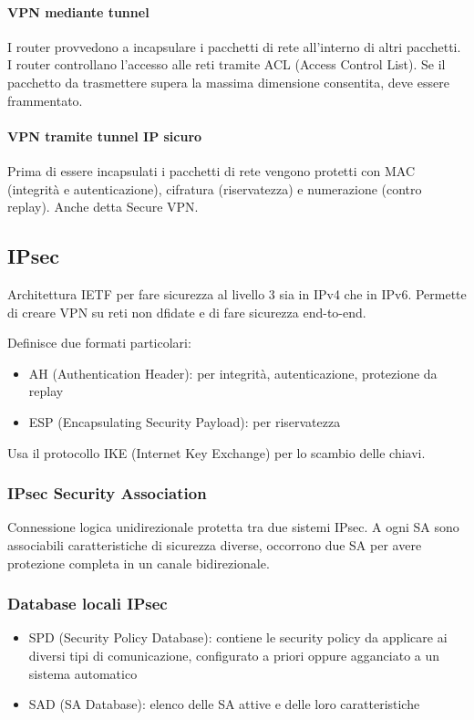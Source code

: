\documentclass[11pt]{article}
\begin{document}
\paragraph*{VPN mediante tunnel}
I router provvedono a incapsulare i pacchetti di rete all'interno di altri pacchetti. I router controllano l'accesso alle 
reti tramite ACL (Access Control List).
Se il pacchetto da trasmettere supera la massima dimensione consentita, deve essere frammentato.
\paragraph*{VPN tramite tunnel IP sicuro}
Prima di essere incapsulati i pacchetti di rete vengono protetti con MAC (integrità e autenticazione), cifratura (riservatezza)
e numerazione (contro replay). Anche detta Secure VPN.
\subsection{IPsec}
Architettura IETF per fare sicurezza al livello 3 sia in IPv4 che in IPv6. Permette di creare VPN su reti non dfidate e 
di fare sicurezza end-to-end.

Definisce due formati particolari:
\begin{itemize}
    \item AH (Authentication Header): per integrità, autenticazione, protezione da replay
    \item ESP (Encapsulating Security Payload): per riservatezza 
\end{itemize}
Usa il protocollo IKE (Internet Key Exchange) per lo scambio delle chiavi.
\subsubsection{IPsec Security Association}
Connessione logica unidirezionale protetta tra due sistemi IPsec. A ogni SA sono associabili caratteristiche di sicurezza 
diverse, occorrono due SA per avere protezione completa in un canale bidirezionale.
\subsubsection{Database locali IPsec}
\begin{itemize}
    \item SPD (Security Policy Database): contiene le security policy da applicare ai diversi tipi di comunicazione, configurato 
    a priori oppure agganciato a un sistema automatico 
    \item SAD (SA Database): elenco delle SA attive e delle loro caratteristiche
\end{itemize}
\end{document}

